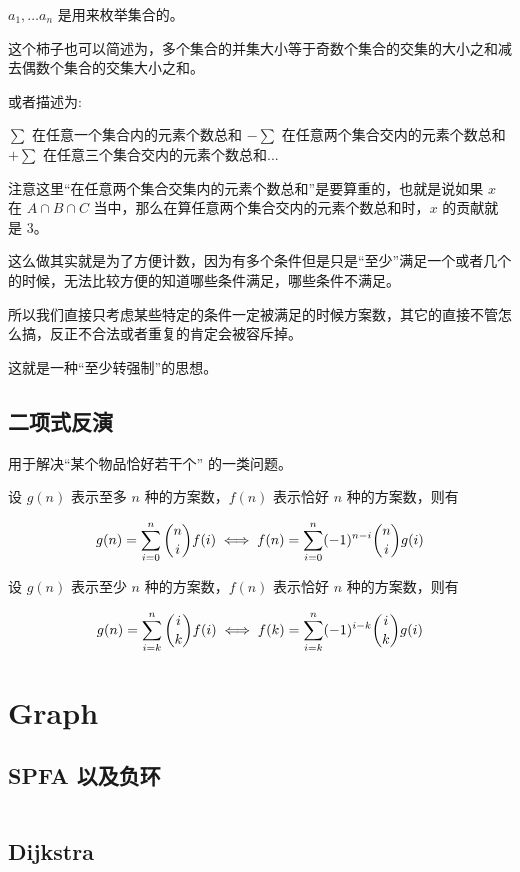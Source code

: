 \documentclass[titlepage, a4paper]{article}
\begin{document}
\begin{multicols}{2}
\begin{spacing}{0.6}
				 	$a_1, \dots a_n$ 是用来枚举集合的。
				 	
				 	这个柿子也可以简述为，多个集合的并集大小等于奇数个集合的交集的大小之和减去偶数个集合的交集大小之和。
				 	
				 	或者描述为:
				 	
				 	$\sum$ 在任意一个集合内的元素个数总和 $−\sum$ 在任意两个集合交内的元素个数总和 $+\sum$ 在任意三个集合交内的元素个数总和...
				 	
				 	注意这里“在任意两个集合交集内的元素个数总和”是要算重的，也就是说如果 $x$ 在 $A\cap B \cap C$ 当中，那么在算任意两个集合交内的元素个数总和时，$x$ 的贡献就是 $3$。
				 	
				 	这么做其实就是为了方便计数，因为有多个条件但是只是“至少”满足一个或者几个的时候，无法比较方便的知道哪些条件满足，哪些条件不满足。
				 	
				 	所以我们直接只考虑某些特定的条件一定被满足的时候方案数，其它的直接不管怎么搞，反正不合法或者重复的肯定会被容斥掉。
				 	
				 	这就是一种“至少转强制”的思想。
			 	\subsection{二项式反演}
			 	 	用于解决“某个物品恰好若干个” 的一类问题。
			 	 	
			 		设 $g(n)$ 表示至多 $n$ 种的方案数，$f(n)$ 表示恰好 $n$ 种的方案数，则有
			 		
			 		$$
			 		g(n) =  \sum\limits_{i = 0}^n \dbinom{n}{i} f(i) \iff f(n) = \sum\limits_{i = 0}^n (-1)^{n - i}\dbinom{n}{i}g(i)
			 		$$ 
			 		
			 		设 $g(n)$ 表示至少 $n$ 种的方案数，$f(n)$ 表示恰好 $n$ 种的方案数，则有
			 		
			 		$$
			 		g(n) = \sum\limits_{i = k}^n\dbinom{i}{k}f(i) \iff f(k) = \sum\limits_{i = k}^n (-1)^{i - k}\dbinom{i}{k} g(i)
			 		$$
			 	
			 \section{Graph}
			 	\subsection{SPFA 以及负环}
			 		\inputminted{cpp}{src/Graph/Spfa.cpp}
			 	\subsection{Dijkstra}
			 		\inputminted{cpp}{src/Graph/Dijkstra.cpp}

\end{spacing}
\end{multicols}
\end{document}
